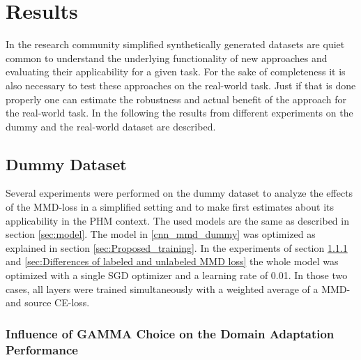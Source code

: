 \chapter{Results}\label{chapter:results}
In the research community simplified synthetically generated datasets are quiet common to understand the underlying functionality of new approaches and evaluating their applicability for a given task. For the sake of completeness it is also necessary to test these approaches on the real-world task. Just if that is done properly one can estimate the robustness and actual benefit of the approach for the real-world task. In the following the results from different experiments on the dummy and the real-world dataset are described.

\section{Dummy Dataset}\label{sec:results_dummy_dataset}
Several experiments were performed on the dummy dataset to analyze the effects of the MMD-loss in a simplified setting and to make first estimates about its applicability in the PHM context. The used models are the same as described in section \ref{sec:model}. The model in \ref{cnn_mmd_dummy} was optimized as explained in section \ref{sec:Proposed_training}. In the experiments of section \ref{sec:Balancing Cross-Entropy and MMD loss} and \ref{sec:Differences of labeled and unlabeled MMD loss} the whole model was optimized with a single SGD optimizer and a learning rate of 0.01. In those two cases, all layers were trained simultaneously with a weighted average of a MMD- and source CE-loss.

\subsection{Influence of GAMMA Choice on the Domain Adaptation Performance} \label{sec:Balancing Cross-Entropy and MMD loss}

